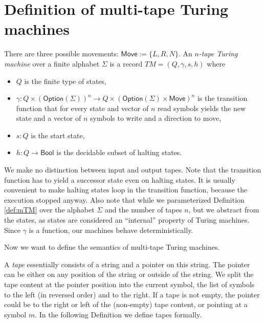 \documentclass{psartcl}
\newcommand{\MS}[1]{\textsf{#1}}
\newcommand{\setOf}[1]{\bigl \{ #1 \bigr \}}
\newcommand{\from}{:}
\renewcommand{\to}{\rightarrow}
\newcommand{\Option}{\MS{Option}}
\newcommand{\Bool}{\MS{Bool}}
\begin{document}
\section{Definition of multi-tape Turing machines}
\label{sec:def}

\begin{definition}
  \label{def:mTM}
  There are three possible movements:  $\MS{Move} := \setOf{L, R, N}$.
  An \emph{$n$-tape Turing machine} over a finite alphabet $\Sigma$ is a record $TM = (Q, \gamma, s, h)$ where
  \begin{itemize}
    \item $Q$ is the finite type of states,
    \item $\gamma \from Q \times (\Option(\Sigma))^n \to Q \times (\Option(\Sigma) \times \MS{Move})^n$ is the transition function that for every state and
      vector of $n$ read symbols yields the new state and a vector of $n$ symbols to write and a direction to move,
    \item $s:Q$ is the start state,
    \item $h \from Q \to \Bool$ is the decidable subset of halting states.
  \end{itemize}
\end{definition}

We make no distinction between input and output tapes.  Note that the transition function has to yield a successor state even on halting states.  It
is usually convenient to make halting states loop in the transition function, because the execution stopped anyway.  Also note that while we
parameterized Definition \ref{def:mTM} over the alphabet $\Sigma$ and the number of tapes $n$, but we abstract from the states, as states are
considered an ``internal'' property of Turing machines.  Since $\gamma$ is a function, our machines behave deterministically.

Now we want to define the semantics of multi-tape Turing machines.

A \emph{tape} essentially consists of a string and a pointer on this string.  The pointer can be either on any position of the string or outside of
the string.  We split the tape content at the pointer position into the current symbol, the list of symbols to the left (in reversed order) and to the
right.  If a tape is not empty, the pointer could be to the right or left of the (non-empty) tape content, or pointing at a symbol $m$.  In the
following Definition we define tapes formally.
\end{document}
